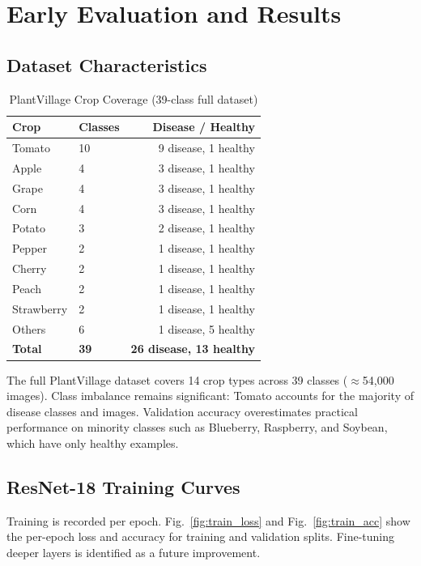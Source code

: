 \documentclass[conference]{IEEEtran}
\begin{document}
\section{Early Evaluation and Results}
\label{sec:eval}

\subsection{Dataset Characteristics}
\label{sec:data}

\begin{table}[H]
\caption{PlantVillage Crop Coverage (39-class full dataset)}
\label{tab:classes}
\centering
\begin{tabular}{@{}llr@{}}
\toprule
\textbf{Crop} & \textbf{Classes} & \textbf{Disease / Healthy} \\
\midrule
Tomato      & 10 & 9 disease, 1 healthy \\
Apple       & 4  & 3 disease, 1 healthy \\
Grape       & 4  & 3 disease, 1 healthy \\
Corn        & 4  & 3 disease, 1 healthy \\
Potato      & 3  & 2 disease, 1 healthy \\
Pepper      & 2  & 1 disease, 1 healthy \\
Cherry      & 2  & 1 disease, 1 healthy \\
Peach       & 2  & 1 disease, 1 healthy \\
Strawberry  & 2  & 1 disease, 1 healthy \\
Others      & 6  & 1 disease, 5 healthy \\
\midrule
\textbf{Total} & \textbf{39} & \textbf{26 disease, 13 healthy} \\
\bottomrule
\end{tabular}
\end{table}

The full PlantVillage dataset covers 14 crop types across 39 classes ($\approx$54,000 images). Class imbalance remains significant: Tomato accounts for the majority of disease classes and images. Validation accuracy overestimates practical performance on minority classes such as Blueberry, Raspberry, and Soybean, which have only healthy examples.

\subsection{ResNet-18 Training Curves}
Training is recorded per epoch. Fig.~\ref{fig:train_loss} and Fig.~\ref{fig:train_acc} show the per-epoch loss and accuracy for training and validation splits. Fine-tuning deeper layers is identified as a future improvement.
\end{document}
